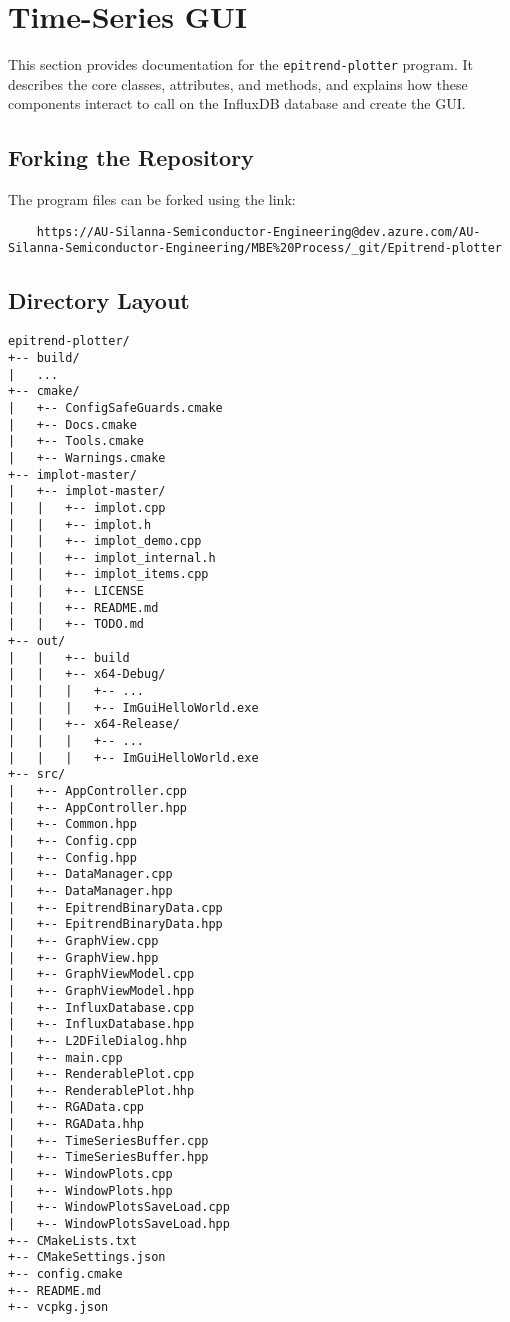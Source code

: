 \documentclass{article}
\begin{document}
\section{Time-Series GUI}
This section provides documentation for the \texttt{epitrend-plotter} program. It describes the core classes, attributes, and methods, and explains how these components interact to call on the InfluxDB database and create the GUI.

\subsection{Forking the Repository}
The program files can be forked using the link:
\begin{lstlisting}
    https://AU-Silanna-Semiconductor-Engineering@dev.azure.com/AU-Silanna-Semiconductor-Engineering/MBE%20Process/_git/Epitrend-plotter
\end{lstlisting}


\subsection{Directory Layout}
\begin{verbatim}
epitrend-plotter/
+-- build/
|   ...
+-- cmake/
|   +-- ConfigSafeGuards.cmake
|   +-- Docs.cmake
|   +-- Tools.cmake
|   +-- Warnings.cmake
+-- implot-master/
|   +-- implot-master/
|   |   +-- implot.cpp
|   |   +-- implot.h
|   |   +-- implot_demo.cpp
|   |   +-- implot_internal.h
|   |   +-- implot_items.cpp
|   |   +-- LICENSE
|   |   +-- README.md
|   |   +-- TODO.md
+-- out/
|   |   +-- build
|   |   +-- x64-Debug/
|   |   |   +-- ...
|   |   |   +-- ImGuiHelloWorld.exe
|   |   +-- x64-Release/
|   |   |   +-- ...
|   |   |   +-- ImGuiHelloWorld.exe
+-- src/
|   +-- AppController.cpp
|   +-- AppController.hpp
|   +-- Common.hpp
|   +-- Config.cpp
|   +-- Config.hpp
|   +-- DataManager.cpp
|   +-- DataManager.hpp
|   +-- EpitrendBinaryData.cpp
|   +-- EpitrendBinaryData.hpp
|   +-- GraphView.cpp
|   +-- GraphView.hpp
|   +-- GraphViewModel.cpp
|   +-- GraphViewModel.hpp
|   +-- InfluxDatabase.cpp
|   +-- InfluxDatabase.hpp
|   +-- L2DFileDialog.hhp
|   +-- main.cpp
|   +-- RenderablePlot.cpp
|   +-- RenderablePlot.hhp
|   +-- RGAData.cpp
|   +-- RGAData.hhp
|   +-- TimeSeriesBuffer.cpp
|   +-- TimeSeriesBuffer.hpp
|   +-- WindowPlots.cpp
|   +-- WindowPlots.hpp
|   +-- WindowPlotsSaveLoad.cpp
|   +-- WindowPlotsSaveLoad.hpp
+-- CMakeLists.txt
+-- CMakeSettings.json
+-- config.cmake
+-- README.md
+-- vcpkg.json
\end{verbatim}
\end{document}
